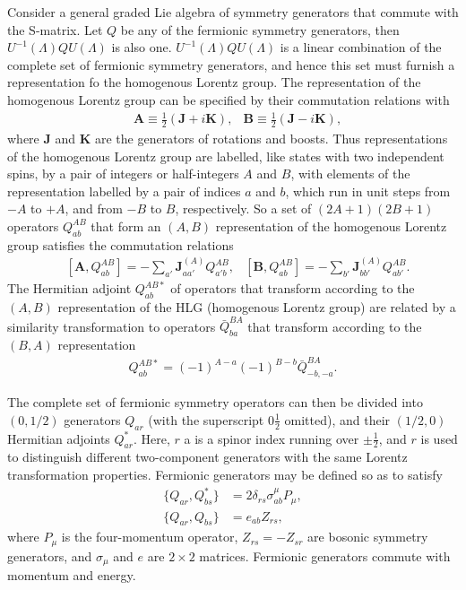\documentclass[twoside,english]{uiofysmaster}
\begin{document}
Consider a general graded Lie algebra of symmetry generators that commute with the S-matrix. Let $Q$ be any of the fermionic symmetry generators, then $U^{-1}(\Lambda)QU(\Lambda)$ is also one. $U^{-1}(\Lambda)QU(\Lambda)$ is a linear combination of the complete set of fermionic symmetry generators, and hence this set must furnish a representation fo the homogenous Lorentz group. The representation of the homogenous Lorentz group can be specified by their commutation relations with
\begin{align}
&\textbf{A} \equiv \frac{1}{2} (\textbf{J} + i \textbf{K}), &\textbf{B} \equiv \frac{1}{2} (\textbf{J} - i \textbf{K}),
\end{align}
where \textbf{J} and \textbf{K} are the generators of rotations and boosts. Thus representations of the homogenous Lorentz group are labelled, like states with two independent spins, by a pair of integers or half-integers $A$ and $B$, with elements of the representation labelled by a pair of indices $a$ and $b$, which run in unit steps from $-A$ to  $+A$, and from $-B$ to $B$, respectively. So a set of $(2A+1)(2B+1)$ operators $Q^{AB}_{ab}$ that form an $(A, B)$ representation of the homogenous Lorentz group satisfies the commutation relations
\begin{align}
& [\textbf{A}, Q_{ab}^{AB}] = - \sum_{a'} \textbf{J}_{aa'}^{(A)} Q_{a'b}^{AB}, &[\textbf{B}, Q_{ab}^{AB}] = - \sum_{b'}\textbf{J}_{bb'}^{(A)} Q_{ab'}^{AB}.
\end{align}
The Hermitian adjoint $Q_{ab}^{AB*}$ of operators that transform according to the $(A,B)$ representation of the HLG (homogenous Lorentz group) are related by a similarity transformation to operators $\bar{Q}_{ba}^{BA}$ that transform according to the $(B, A)$ representation
\begin{align}
Q_{ab}^{AB*} = (-1)^{A-a} (-1)^{B-b} \bar{Q}_{-b,-a}^{BA}. 
\end{align}

The complete set of fermionic symmetry operators can then be divided into $(0, 1/2)$ generators $Q_{ar}$ (with the superscript $0 \frac{1}{2}$ omitted), and their $(1/2,0)$ Hermitian adjoints $Q_{ar}^*$. Here, $r$ a is a spinor index running over $\pm \frac{1}{2}$, and $r$ is used to distinguish different two-component generators with the same Lorentz transformation properties. Fermionic generators may be defined so as to satisfy
\begin{align}\label{Eq:: supersymmetry algebra}
\{ Q_{ar}, Q_{bs}^* \} &= 2 \delta_{rs} \sigma_{ab}^{\mu} P_{\mu},\\
\{ Q_{ar}, Q_{bs} \} &= e_{ab} Z_{rs},
\end{align}
where $P_{\mu}$ is the four-momentum operator, $Z_{rs} = - Z_{sr}$ are bosonic symmetry generators, and $\sigma_{\mu}$ and $e$ are $2 \times 2$ matrices. Fermionic generators commute with momentum and energy.
\end{document}
